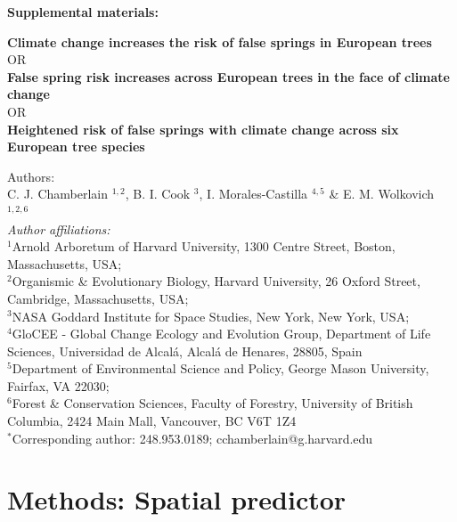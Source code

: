 \documentclass{article}\usepackage[]{graphicx}\usepackage[]{color}
\begin{document}
\noindent \textbf{\Large{Supplemental materials:}}\\
{\textbf{\Large{Climate change increases the risk of false springs in European trees}} \\
OR \\
\textbf{\Large{False spring risk increases across European trees in the face of climate change}} \\
OR \\
\textbf{\Large{Heightened risk of false springs with climate change across six European tree species}}


\noindent Authors:\\
C. J. Chamberlain $^{1,2}$, B. I. Cook $^{3}$, I. Morales-Castilla $^{4,5}$ \& E. M. Wolkovich $^{1,2,6}$
\vspace{2ex}\\
\emph{Author affiliations:}\\
$^{1}$Arnold Arboretum of Harvard University, 1300 Centre Street, Boston, Massachusetts, USA; \\
$^{2}$Organismic \& Evolutionary Biology, Harvard University, 26 Oxford Street, Cambridge, Massachusetts, USA; \\
$^{3}$NASA Goddard Institute for Space Studies, New York, New York, USA; \\
$^{4}$GloCEE - Global Change Ecology and Evolution Group, Department of Life Sciences, Universidad de Alcal\'{a}, Alcal\'{a} de Henares, 28805, Spain \\
$^{5}$Department of Environmental Science and Policy, George Mason University, Fairfax, VA 22030; \\
$^{6}$Forest \& Conservation Sciences, Faculty of Forestry, University of British Columbia, 2424 Main Mall, Vancouver, BC V6T 1Z4\\
\vspace{2ex}
$^*$Corresponding author: 248.953.0189; cchamberlain@g.harvard.edu\\

\renewcommand{\thetable}{\arabic{table}}
\renewcommand{\thefigure}{\arabic{figure}}
\renewcommand{\labelitemi}{$-$}

\section*{Methods: Spatial predictor} %

}
\end{document}
